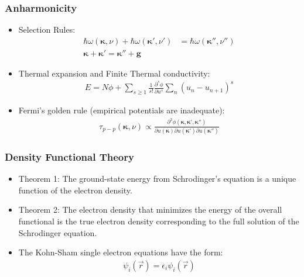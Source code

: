 \documentclass[]{beamer}
\begin{document}
\begin{frame}
  \frametitle{Anharmonicity}   %
  \begin{itemize}
  \item Selection Rules:
  \begin{align*}
	\hbar\omega(\pmb{\kappa},\nu)+\hbar\omega(\pmb{\kappa}',\nu')&=\hbar\omega(\pmb{\kappa}'',\nu'')\\
	\pmb{\kappa}+\pmb{\kappa'}=\pmb{\kappa''}+\pmb{g}
\end{align*}
  \item Thermal expansion and Finite Thermal conductivity:
  \begin{align*}
	E=N\phi+\sum_{s\geq1}\frac{1}{s!}\frac{\partial^s\phi}{\partial u^s}\sum_n(u_n-u_{n+1})^s
  \end{align*}
  \item Fermi's golden rule (empirical potentials are inadequate):
\begin{align*}
	\tau_{p-p}(\pmb{\kappa}, \nu) \propto \frac{\partial^3\phi(\pmb{\kappa}, \pmb{\kappa}',\pmb{\kappa}'')}{\partial u(\pmb{\kappa})\partial u(\pmb{\kappa}')\partial u(\pmb{\kappa}'')}
  \end{align*}
  \end{itemize}
\end{frame}

\begin{frame}
  \frametitle{Density Functional Theory}   %
  \begin{itemize}
  \item Theorem 1: The ground-state energy from Schrodinger's equation is a unique function of the electron density.
  \item Theorem 2: The electron density that minimizes the energy of the overall functional is the true electron density corresponding to the full solution of the Schrodinger equation.
  \item The Kohn-Sham single electron equations have the form:
\begin{align*}
	[\frac{\hbar^2}{2m}\nabla^2+V(\vec{r})+V_H(\vec{r})+V_{XC}]\psi_i(\vec{r})=\epsilon_i\psi_i(\vec{r})
\end{align*}
  \end{itemize}
\end{frame}
\end{document}

